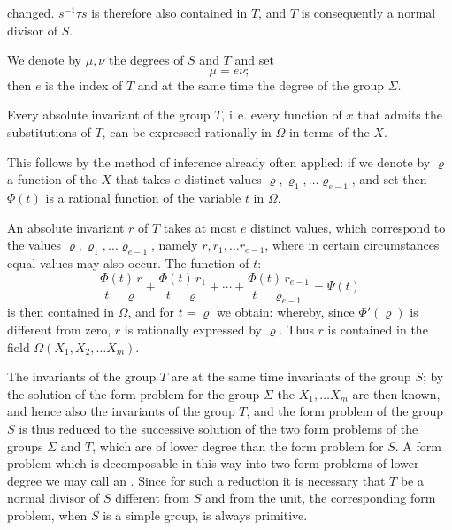 

changed. $s^{-1}\tau s$ is therefore also contained in $T$, and $T$ is consequently a normal divisor of $S$.

We denote by $\mu, \nu$ the degrees of $S$ and $T$ and set
\[
\mu = e\nu;
\]
then $e$ is the index of $T$ and at the same time the degree of the group $\Sigma$.

Every absolute invariant of the group $T$, i.\,e. every function of $x$ that admits the substitutions of $T$, can be expressed rationally in $\Omega$ in terms of the $X$.

This follows by the method of inference already often applied: if we denote by $\varrho$ a function of the $X$ that takes $e$ distinct values $\varrho, \varrho_1, \ldots \varrho_{e-1}$, and set
then $\Phi(t)$ is a rational function of the variable $t$ in $\Omega$.

An absolute invariant $r$ of $T$ takes at most $e$ distinct values, which correspond to the values $\varrho, \varrho_1, \ldots \varrho_{e-1}$, namely $r, r_1, \ldots r_{e-1}$, where in certain circumstances equal values may also occur. The function of $t$:
\[
\frac{\Phi(t)\,r}{t-\varrho} + \frac{\Phi(t)\,r_1}{t-\varrho} + \cdots + \frac{\Phi(t)\,r_{e-1}}{t-\varrho_{e-1}} = \Psi(t) %
\]
is then contained in $\Omega$, and for $t=\varrho$ we obtain:
whereby, since $\Phi'(\varrho)$ is different from zero, $r$ is rationally expressed by $\varrho$. Thus $r$ is contained in the field $\Omega(X_1, X_2, \ldots X_m)$.

The invariants of the group $T$ are at the same time invariants of the group $S$; by the solution of the form problem for the group $\Sigma$ the $X_1, \ldots X_m$ are then known, and hence also the invariants of the group $T$, and the form problem of the group $S$ is thus reduced to the successive solution of the two form problems of the groups $\Sigma$ and $T$, which are of lower degree than the form problem for $S$. A form problem which is decomposable in this way into two form problems of lower degree we may call an . Since for such a reduction it is necessary that $T$ be a normal divisor of $S$ different from $S$ and from the unit, the corresponding form problem, when $S$ is a simple group, is always primitive.
